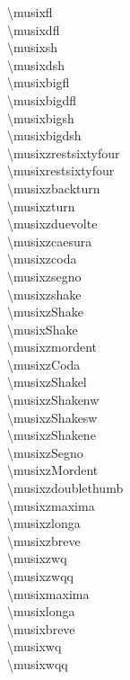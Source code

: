\documentclass[a4paper]{scrartcl}
\begin{document}


\musixfl \textbackslash musixfl\\
\musixdfl \textbackslash musixdfl\\
\musixsh \textbackslash musixsh\\
\musixdsh \textbackslash musixdsh\\
\musixbigfl \textbackslash musixbigfl\\
\musixbigdfl \textbackslash musixbigdfl\\
\musixbigsh \textbackslash musixbigsh\\
\musixbigdsh \textbackslash musixbigdsh\\
%
\musixzrestsixtyfour \textbackslash musixzrestsixtyfour\\
\musixrestsixtyfour \textbackslash musixrestsixtyfour\\
%
\musixzbackturn \textbackslash musixzbackturn\\
\musixzturn \textbackslash musixzturn\\
%
\musixzduevolte \textbackslash musixzduevolte\\
\musixzcaesura \textbackslash musixzcaesura\\
%
\musixzcoda \textbackslash musixzcoda\\
\musixzsegno \textbackslash musixzsegno\\
\musixzshake \textbackslash musixzshake\\
\musixzShake \textbackslash musixzShake\\
\musixShake \textbackslash musixShake\\
\musixzmordent \textbackslash musixzmordent\\
%
\musixzCoda \textbackslash musixzCoda\\
\musixzShakel \textbackslash musixzShakel\\
\musixzShakenw \textbackslash musixzShakenw\\
\musixzShakesw \textbackslash musixzShakesw\\
\musixzShakene \textbackslash musixzShakene\\
\musixzSegno \textbackslash musixzSegno\\
\musixzMordent \textbackslash musixzMordent\\
\musixzdoublethumb \textbackslash musixzdoublethumb\\

\musixzmaxima \textbackslash musixzmaxima\\
\musixzlonga \textbackslash musixzlonga\\
\musixzbreve \textbackslash musixzbreve\\
\musixzwq \textbackslash musixzwq\\
\musixzwqq \textbackslash musixzwqq\\

\musixmaxima \textbackslash musixmaxima\\
\musixlonga \textbackslash musixlonga\\
\musixbreve \textbackslash musixbreve\\
\musixwq \textbackslash musixwq\\
\musixwqq \textbackslash musixwqq\\
\end{document}

